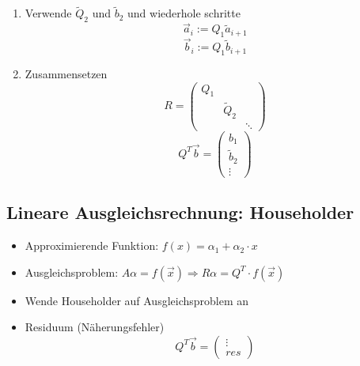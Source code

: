 \begin{enumerate}
	\item Verwende $\widetilde{Q}_2$ und $\widetilde{b}_2$ und wiederhole schritte
	\begin{equation*}
		\vec{a}_i := Q_1\widetilde{a}_{i+1}
	\end{equation*}
	\begin{equation*}
		\vec{b}_i := Q_1\widetilde{b}_{i+1}
	\end{equation*}
	
	\item Zusammensetzen
	\begin{displaymath}
		R =
		\begin{pmatrix}
			Q_1 & & \\
			& \widetilde{Q}_2 & \\
			& & \ddots
		\end{pmatrix}
	\end{displaymath}
	\begin{displaymath}
		Q^T \vec{b} =
		\begin{pmatrix}
			b_1 \\
			\widetilde{b}_2 \\
			\vdots
		\end{pmatrix}
	\end{displaymath}

\end{enumerate}

\subsection{Lineare Ausgleichsrechnung: Householder}
\begin{itemize}
	
	\item Approximierende Funktion: $f(x) = \alpha_1 + \alpha_2 \cdot x$ \\
	
	\item Ausgleichsproblem: $A\alpha = f(\vec{x}) \Rightarrow R\alpha = Q^T \cdot f(\vec{x})$
	
	\item Wende Householder auf Ausgleichsproblem an
	
	\item Residuum (Näherungsfehler)
	\begin{displaymath}
		Q^T\vec{b} = 
		\begin{pmatrix}
			\vdots \\
			res
		\end{pmatrix}
	\end{displaymath}

\end{itemize}
